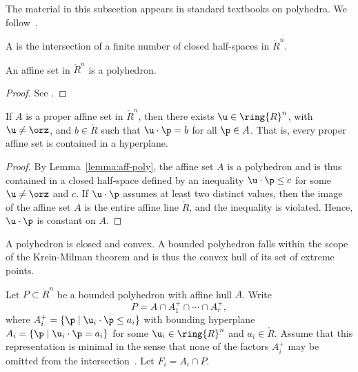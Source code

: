 The material in this subsection appears in standard textbooks on polyhedra.
We follow~\cite{webster:1994}.

\begin{definition}[polyhedron]
A  is the
intersection of a finite number of closed half-spaces in
$\ring{R}^n$.  
\end{definition}
%

\begin{lemma}[]\cutrate{}\label{lemma:aff-poly}
An affine set in $\ring{R}^n$ is a polyhedron.
\end{lemma}

\begin{proof} See \cite[Cor~1.4.2]{webster:1994}.
\end{proof}

\begin{lemma}[]\label{lemma:aff-u}
If $A$ is a proper affine set in $\ring{R}^n$, then there exists $\u\in \ring{R}^n$, with
$\u\ne\orz$, and $b\in\ring{R}$ 
such that $\u\cdot\p = b$ for all $\p\in A$.  That is, every proper affine set
is contained in a hyperplane.
\end{lemma}

\begin{proof}
By Lemma~\ref{lemma:aff-poly},
the affine set $A$ is a polyhedron and is thus contained in a closed half-space defined by an
inequality $\u\cdot\p \le c$ for some $\u\ne \orz$ and $c$.  If $\u\cdot\p$ assumes
at least two distinct values, then the image of the affine set $A$ 
is the entire affine line $\ring{R}$, and the inequality is violated.
Hence, $\u\cdot\p$ is constant on $A$.
\end{proof}

A polyhedron is closed and convex.  A bounded polyhedron falls within
the scope of the Krein-Milman theorem and is thus the convex hull of
its set of extreme points.  %

Let $P\subset\ring{R}^n$ be a bounded polyhedron with affine hull
$A$. Write
\begin{equation}\label{eqn:polyrep}
P = A \cap A^+_1 \cap \cdots \cap A^+_r,
\end{equation}
where $A^+_i = \{\p\mid \u_i\cdot \p \le a_i\}$ with bounding
hyperplane $A_i=\{\p\mid \u_i \cdot \p = a_i\}$ for some $\u_i\in
\ring{R}^n$ and $a_i\in\ring{R}$.  Assume that this representation is
minimal in the sense that none of the factors $A^+_i$ may be omitted from
the intersection~.
Let $F_i = A_i\cap P$.  %


